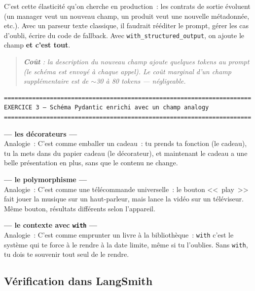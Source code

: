 \documentclass[11pt,a4paper]{article}
\begin{document}
C'est cette élasticité qu'on cherche en production~: les contrats de
sortie évoluent (un manager veut un nouveau champ, un produit veut une
nouvelle métadonnée, etc.). Avec un parseur texte classique, il faudrait
rééditer le prompt, gérer les cas d'oubli, écrire du code de fallback.
Avec \texttt{with\_structured\_output}, on ajoute le champ \textbf{et c'est
tout}.

\begin{quote}\itshape
\textbf{Coût} : la description du nouveau champ ajoute quelques tokens
au prompt (le schéma est envoyé à chaque appel). Le coût marginal d'un
champ supplémentaire est de $\sim$30 à 80 tokens — négligeable.
\end{quote}

\begin{tcolorbox}[
  colback=white,
  colframe=black!50,
  coltitle=black,
  fonttitle=\footnotesize\bfseries,
  fontupper=\footnotesize,
  title=Sortie de l'exécution,
  breakable,
]
\begin{verbatim}
======================================================================
EXERCICE 3 — Schéma Pydantic enrichi avec un champ analogy
======================================================================
\end{verbatim}

\textbf{--- les décorateurs ---}\\
Analogie~: C'est comme emballer un cadeau~: tu prends ta fonction (le
cadeau), tu la mets dans du papier cadeau (le décorateur), et maintenant
le cadeau a une belle présentation en plus, sans que le contenu ne
change.

\textbf{--- le polymorphisme ---}\\
Analogie~: C'est comme une télécommande universelle~: le bouton
<<~play~>> fait jouer la musique sur un haut-parleur, mais lance la
vidéo sur un téléviseur. Même bouton, résultats différents selon
l'appareil.

\textbf{--- le contexte avec \texttt{with} ---}\\
Analogie~: C'est comme emprunter un livre à la bibliothèque~:
\texttt{with} c'est le système qui te force à le rendre à la date
limite, même si tu l'oublies. Sans \texttt{with}, tu dois te souvenir
tout seul de le rendre.
\end{tcolorbox}

\subsection{Vérification dans LangSmith}
\end{document}
